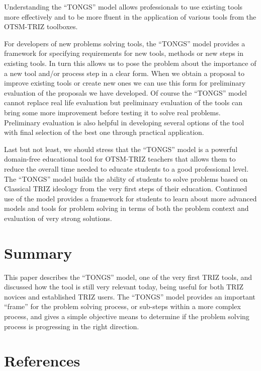 \documentclass[11pt,a4paper]{article}
\begin{document}
Understanding the “TONGS” model allows professionals to use existing tools
more effectively and to be more fluent in the application of various tools
from the OTSM-TRIZ toolboxes.

For developers of new problems solving tools, the “TONGS” model provides a
framework for specifying requirements for new tools, methods or new steps in
existing tools.  In turn this allows us to pose the problem about the
importance of a new tool and/or process step in a clear form.  When we obtain
a proposal to improve existing tools or create new ones we can use this form
for preliminary evaluation of the proposals we have developed. Of course the
“TONGS” model cannot replace real life evaluation but preliminary evaluation
of the tools can bring some more improvement before testing it to solve real
problems.  Preliminary evaluation is also helpful in developing several
options of the tool with final selection of the best one through practical
application.

Last but not least, we should stress that the “TONGS” model is a powerful
domain-free educational tool for OTSM-TRIZ teachers that allows them to reduce
the overall time needed to educate students to a good professional level.  The
“TONGS” model builds the ability of students to solve problems based on
Classical TRIZ ideology from the very first steps of their education.
Continued use of the model provides a framework for students to learn about
more advanced models and tools for problem solving in terms of both the
problem context and evaluation of very strong solutions.

\section{Summary}

This paper describes the “TONGS” model, one of the very first TRIZ tools, and
discussed how the tool is still very relevant today, being useful for both
TRIZ novices and established TRIZ users. The “TONGS” model provides an
important “frame” for the problem solving process, or sub-steps within a more
complex process, and gives a simple objective means to determine if the
problem solving process is progressing in the right direction.

\section*{References}
\end{document}
